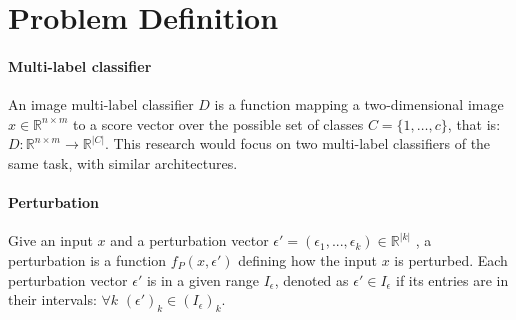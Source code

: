 
\section{Problem Definition}

\sloppy
\paragraph{Multi-label classifier}
An image multi-label classifier $D$ is a function mapping a two-dimensional image $x\in \mathbb{R}^{n \times m}$ to a score vector over the possible set of classes $C=\{1,\ldots,c\}$, that is:
$D: \mathbb{R}^{n \times m} \rightarrow {\mathbb{R}}^{|C|}$.
This research would focus on two multi-label classifiers of the same task, with similar architectures.

\paragraph{Perturbation}
Give an input $x$ and a perturbation vector $\epsilon'=(\epsilon_1,...,\epsilon_k)\in{\mathbb{R}}^{|k|}$
, a perturbation is a function $f_P(x,\epsilon')$ defining how the input $x$ is perturbed. Each perturbation vector $\epsilon'$ is in a given range $I_\epsilon$, denoted as $\epsilon'\in I_\epsilon$ if its entries are in their intervals: $\forall{k}$ $(\epsilon')_k\in (I_\epsilon)_k$.

